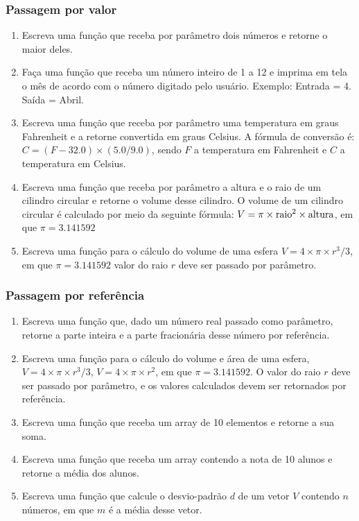 \documentclass[a4paper,10pt]{article}
\begin{document}
\begin{multicols*}{2}
\subsubsection{Passagem por valor}

\setlength{\leftmargini}{0pt}
\begin{enumerate}
  \item Escreva uma função que receba por parâmetro dois números e retorne o maior deles.
  \item Faça uma função que receba um número inteiro de 1 a 12 e imprima em tela o mês de acordo com o número digitado pelo usuário. Exemplo: Entrada = 4. Saída = Abril.
  \item Escreva uma função que receba por parâmetro uma temperatura em graus Fahrenheit e a retorne convertida em graus Celsius. A fórmula de conversão é: $C = (F - 32.0) \times (5.0/9.0)$, sendo $F$ a temperatura em Fahrenheit e $C$ a temperatura em Celsius.
  \item Escreva uma função que receba por parâmetro a altura e o raio de um cilindro circular e retorne o volume desse cilindro. O volume de um cilindro circular é calculado por meio da seguinte fórmula: $V = \pi \times \textnormal{raio}^2 \times \textnormal{altura}$, em que $\pi = 3.141592$
  \item Escreva uma função para o cálculo do volume de uma esfera $V = 4 \times \pi \times r^3 / 3$, em que $\pi = 3.141592$ valor do raio $r$ deve ser passado por parâmetro.
\end{enumerate}

\subsubsection{Passagem por referência}

\setlength{\leftmargini}{0pt}
\begin{enumerate}
  \item Escreva uma função que, dado um número real passado como parâmetro, retorne a parte inteira e a parte fracionária desse número por referência.
  \item Escreva uma função para o cálculo do volume e área de uma esfera, $V = 4 \times \pi \times r^3 / 3$, $V = 4 \times \pi \times r^2$, em que $\pi = 3.141592$. O valor do raio $r$ deve ser passado por parâmetro, e os valores calculados devem ser retornados por referência.
  \item Escreva uma função que receba um array de 10 elementos e retorne a sua soma.
  \item Escreva uma função que receba um array contendo a nota de 10 alunos e retorne a média dos alunos.
  \item Escreva uma função que calcule o desvio-padrão $d$ de um vetor $V$ contendo $n$ números, em que $m$ é a média desse vetor.


\end{enumerate}
\end{multicols*}
\end{document}
